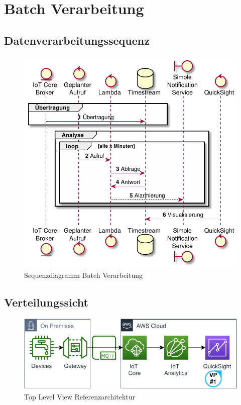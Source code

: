 \section{Batch Verarbeitung}

\subsection{Datenverarbeitungssequenz}

\begin{figure}[H]
\centering
\includegraphics[width=\textwidth]{graphics/batch-ra.pdf}
\caption{Sequenzdiagramm Batch Verarbeitung}
\label{abb:SequenceBatchRA}
\end{figure}

\subsection{Verteilungssicht}
\begin{figure}[H]
\centering
\includegraphics[width=\textwidth]{graphics/DB-RA-Overview.pdf}
\caption{Top Level View Referenzarchitektur}
\label{abb:TopLevelDBRA}
\end{figure}

